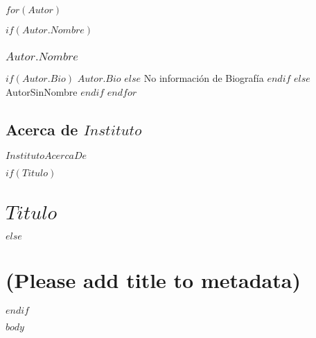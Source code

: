 \documentclass[11pt,fleqn]{book} %
\begin{document}
$for(Autor)$

	$if(Autor.Nombre)$
	\subsection{$Autor.Nombre$}
		$if(Autor.Bio)$ 
			$Autor.Bio$
		$else$
			No información de Biografía
		$endif$
	$else$
		AutorSinNombre
	$endif$
$endfor$

\section{Acerca de $Instituto$}

$InstitutoAcercaDe$



$if(Titulo)$
\chapter{$Titulo$}
$else$
\chapter{(Please add title to metadata)}
$endif$

$body$


\end{document}
